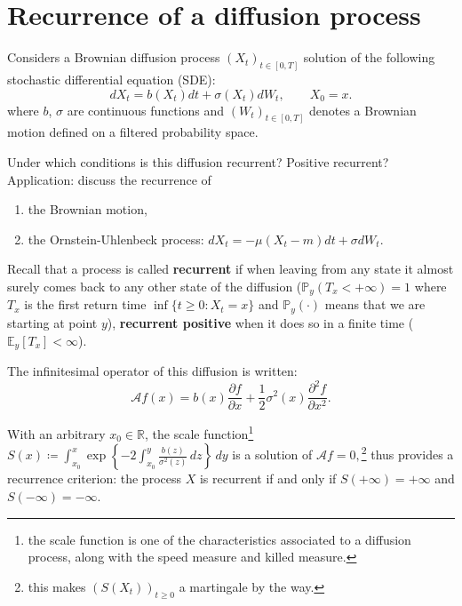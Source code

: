 \section{Recurrence of a diffusion process}

\begin{tcolorbox}[width=\linewidth, sharp corners=all, colback=white!95!black]
    Considers a Brownian diffusion process $(X_t)_{t\in [0,T]}$ solution of the following stochastic differential equation (SDE):
    \begin{equation*}\label{SDE}
    dX_t=b(X_t)dt+\sigma(X_t)dW_t,\qquad X_0=x.
    \end{equation*}
    where $b$, $\sigma$ are continuous functions and $(W_t)_{t\in [0,T]}$ denotes a Brownian motion defined on a filtered probability space.\newline

    Under which conditions is this diffusion recurrent? Positive recurrent?\\

    Application: discuss the recurrence of
    \begin{enumerate}
        \item the Brownian motion,
        \item the Ornstein-Uhlenbeck process: $dX_t=-\mu(X_t - m) dt + \sigma dW_t.$
    \end{enumerate}

\end{tcolorbox}

Recall that a process is called \textbf{recurrent} if when leaving from any state it almost surely comes back to any other state of the diffusion ($\mathbb{P}_y(T_x < +\infty) = 1$ where $T_x$ is the first return time $\inf \{t\geq 0 : X_t = x\}$ and $\mathbb{P}_y(\cdot)$ means that we are starting at point $y$), \textbf{recurrent positive} when it does so in a finite time ($\mathbb{E}_{y}\left[T_x\right] < \infty$).\newline

The infinitesimal operator of this diffusion is written:
\[
\mathcal{A}f(x) = b(x) \dfrac{\partial f}{\partial x} + \dfrac{1}{2}\sigma^2(x) \dfrac{\partial^2 f}{\partial x^2}. 
\]

With an arbitrary $x_0 \in \mathbb{R}$, the scale function\footnote{the scale function is one of the characteristics associated to a diffusion process, along with the speed measure and killed measure.} $S(x) \coloneqq \displaystyle \int_{x_0}^{x} \exp\left\{-2\displaystyle \int_{x_0}^{y} \frac{b(z)}{\sigma^2(z)} \,dz\right\} \,dy$ is a solution of $\mathcal{A}f=0,$\footnote{this makes $(S(X_t))_{t\geq0}$ a martingale by the way.} thus provides a recurrence criterion: the process $X$ is recurrent if and only if $S(+\infty) = +\infty$ and $S(-\infty) = -\infty$.\newline

